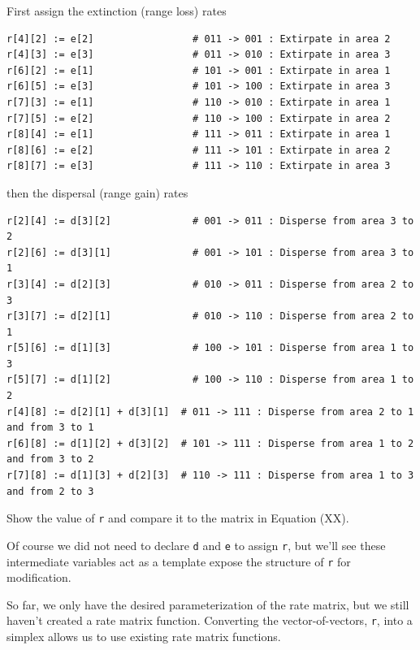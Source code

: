 First assign the extinction (range loss) rates

\begin{snugshade}
\begin{lstlisting}
r[4][2] := e[2]                 # 011 -> 001 : Extirpate in area 2
r[4][3] := e[3]                 # 011 -> 010 : Extirpate in area 3
r[6][2] := e[1]                 # 101 -> 001 : Extirpate in area 1
r[6][5] := e[3]                 # 101 -> 100 : Extirpate in area 3
r[7][3] := e[1]                 # 110 -> 010 : Extirpate in area 1
r[7][5] := e[2]                 # 110 -> 100 : Extirpate in area 2
r[8][4] := e[1]                 # 111 -> 011 : Extirpate in area 1
r[8][6] := e[2]                 # 111 -> 101 : Extirpate in area 2
r[8][7] := e[3]                 # 111 -> 110 : Extirpate in area 3
\end{lstlisting}
\end{snugshade}

then the dispersal (range gain) rates

\begin{snugshade}
\begin{lstlisting}
r[2][4] := d[3][2]              # 001 -> 011 : Disperse from area 3 to 2
r[2][6] := d[3][1]              # 001 -> 101 : Disperse from area 3 to 1
r[3][4] := d[2][3]              # 010 -> 011 : Disperse from area 2 to 3
r[3][7] := d[2][1]              # 010 -> 110 : Disperse from area 2 to 1
r[5][6] := d[1][3]              # 100 -> 101 : Disperse from area 1 to 3
r[5][7] := d[1][2]              # 100 -> 110 : Disperse from area 1 to 2
r[4][8] := d[2][1] + d[3][1]  # 011 -> 111 : Disperse from area 2 to 1 and from 3 to 1
r[6][8] := d[1][2] + d[3][2]  # 101 -> 111 : Disperse from area 1 to 2 and from 3 to 2
r[7][8] := d[1][3] + d[2][3]  # 110 -> 111 : Disperse from area 1 to 3 and from 2 to 3
\end{lstlisting}
\end{snugshade}

Show the value of {\tt r} and compare it to the matrix in Equation (XX).

Of course we did not need to declare {\tt d} and {\tt e} to assign {\tt r}, but we'll see these intermediate variables act as a template expose the structure of {\tt r} for modification.

So far, we only have the desired parameterization of the rate matrix, but we still haven't created a rate matrix function. Converting the vector-of-vectors, {\tt r}, into a simplex allows us to use existing rate matrix functions. 


